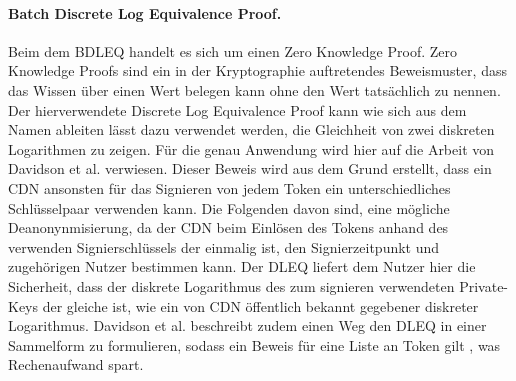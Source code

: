 \documentclass{scrreprt}
\begin{document}
\paragraph{Batch Discrete Log Equivalence Proof.}
Beim dem BDLEQ handelt es sich um einen Zero Knowledge Proof. Zero Knowledge Proofs sind ein in der Kryptographie auftretendes Beweismuster, dass das Wissen über einen Wert belegen kann ohne den Wert tatsächlich zu nennen. Der hierverwendete Discrete Log Equivalence Proof kann wie sich aus dem Namen ableiten lässt dazu verwendet werden, die Gleichheit von zwei diskreten Logarithmen zu zeigen. Für die genau Anwendung wird hier auf die Arbeit von Davidson et al. \cite{pp-davidson2018privacy} verwiesen. Dieser Beweis wird aus dem Grund erstellt, dass ein CDN ansonsten für das Signieren von jedem Token ein unterschiedliches Schlüsselpaar verwenden kann. Die Folgenden davon sind, eine mögliche Deanonynmisierung, da der CDN beim Einlösen des Tokens anhand des verwenden Signierschlüssels der einmalig ist, den Signierzeitpunkt und zugehörigen Nutzer bestimmen kann. Der DLEQ liefert dem Nutzer hier die Sicherheit, dass der diskrete Logarithmus des zum signieren verwendeten Private-Keys der gleiche ist, wie ein von CDN öffentlich bekannt gegebener diskreter Logarithmus. Davidson et al. beschreibt zudem einen Weg den DLEQ in einer Sammelform zu formulieren, sodass ein Beweis für eine Liste an Token gilt \cite{pp-davidson2018privacy}, was Rechenaufwand spart.\\\\
\end{document}
